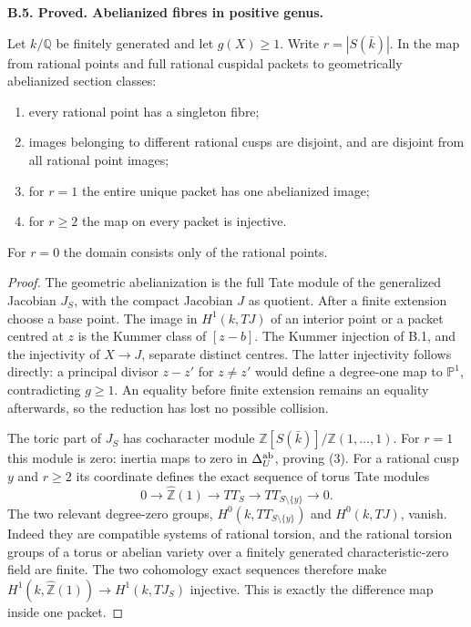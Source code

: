 \documentclass[11pt,oneside]{article}
\makeatletter
\newcounter{statementanchor}
\newenvironment{statement}[3]{%
 \refstepcounter{statementanchor}\def\@currentlabel{#1}%
 \par\addvspace{9pt}\noindent
 \textbf{#1. #2. #3.}\par\nobreak\noindent\ignorespaces
}{\par\addvspace{5pt}}
\makeatother
\begin{document}
\begin{statement}{B.5}{Proved}{Abelianized fibres in positive genus}
\label{st:B.5}

Let $k/\mathbb Q$ be finitely generated and let $g(X)\geq1$.
Write $r=|S(\bar k)|$.  In the map from rational points and full rational
cuspidal packets to geometrically abelianized section classes:
\begin{enumerate}
\item every rational point has a singleton fibre;
\item images belonging to different rational cusps are disjoint, and
      are disjoint from all rational point images;
\item for $r=1$ the entire unique packet has one abelianized image;
\item for $r\geq2$ the map on every packet is injective.
\end{enumerate}
For $r=0$ the domain consists only of the rational points.
\end{statement}
\begin{proof}
The geometric abelianization is the full Tate module of the generalized
Jacobian $J_S$, with the compact Jacobian $J$ as quotient.  After a
finite extension choose a base point.  The image in $H^1(k,TJ)$ of an
interior point or a packet centred at $z$ is the Kummer class of
$[z-b]$.  The Kummer injection of B.1, and the injectivity of
$X\to J$, separate distinct centres.  The latter injectivity follows
directly: a principal divisor $z-z'$ for $z\ne z'$ would define a
degree-one map to $\mathbb P^1$, contradicting $g\geq1$.
An equality before finite extension remains an equality afterwards,
so the reduction has lost no possible collision.

The toric part of $J_S$ has cocharacter module
$\mathbb Z[S(\bar k)]/\mathbb Z(1,\ldots,1)$.
For $r=1$ this module is zero: inertia maps to zero in
$\Delta_U^{\rm ab}$, proving (3).
For a rational cusp $y$ and $r\geq2$ its coordinate defines the exact
sequence of torus Tate modules
\[
 0\to\widehat{\mathbb Z}(1)\to TT_S\to TT_{S\setminus\{y\}}\to0.
\]
The two relevant degree-zero groups, $H^0(k,TT_{S\setminus\{y\}})$ and
$H^0(k,TJ)$, vanish.  Indeed they are compatible systems of rational
torsion, and the rational torsion groups of a torus or abelian variety
over a finitely generated characteristic-zero field are finite.
The two cohomology exact sequences therefore make
$H^1(k,\widehat{\mathbb Z}(1))\to H^1(k,TJ_S)$ injective.
This is exactly the difference map inside one packet.
\end{proof}
\end{document}
